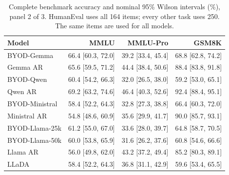 \begin{table}[ht]
\caption{Complete benchmark accuracy and nominal 95\% Wilson intervals (\%), panel 2 of 3. HumanEval uses all 164 items; every other task uses 250. The same items are used for all models.}
\label{tab:benchmark-intervals-2}
\centering
\small
\begin{tabular}{lrrr}
\toprule
Model & MMLU & MMLU-Pro & GSM8K \\
\midrule
BYOD-Gemma & 66.4 [60.3, 72.0] & 39.2 [33.4, 45.4] & 68.8 [62.8, 74.2] \\
Gemma AR & 65.6 [59.5, 71.2] & 44.4 [38.4, 50.6] & 88.4 [83.8, 91.8] \\
BYOD-Qwen & 60.4 [54.2, 66.3] & 32.0 [26.5, 38.0] & 59.2 [53.0, 65.1] \\
Qwen AR & 69.2 [63.2, 74.6] & 46.4 [40.3, 52.6] & 92.4 [88.4, 95.1] \\
BYOD-Ministral & 58.4 [52.2, 64.3] & 32.8 [27.3, 38.8] & 66.4 [60.3, 72.0] \\
Ministral AR & 54.8 [48.6, 60.9] & 35.6 [29.9, 41.7] & 90.0 [85.7, 93.1] \\
BYOD-Llama-25k & 61.2 [55.0, 67.0] & 33.6 [28.0, 39.7] & 64.8 [58.7, 70.5] \\
BYOD-Llama-50k & 60.0 [53.8, 65.9] & 31.6 [26.2, 37.6] & 60.8 [54.6, 66.6] \\
Llama AR & 56.0 [49.8, 62.0] & 43.2 [37.2, 49.4] & 85.2 [80.3, 89.1] \\
LLaDA & 58.4 [52.2, 64.3] & 36.8 [31.1, 42.9] & 59.6 [53.4, 65.5] \\
\bottomrule
\end{tabular}
\end{table}

